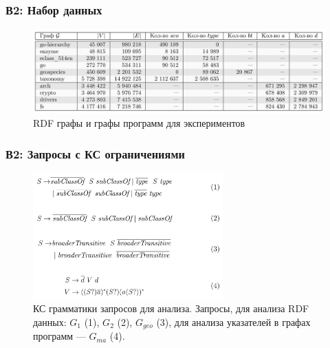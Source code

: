 \documentclass[aspectratio=169,xcolor=table,english]{beamer}
\begin{document}
\begin{frame}[fragile] \frametitle{В2: Набор данных}
    \begin{center}
     \begin{minipage}[m]{0.9\linewidth}
        \begin{figure}
            \centering
            \includegraphics[width=1.0\textwidth]{figures/dataset_rq2.png}
            \caption{RDF графы и графы программ для экспериментов}
        \end{figure}
    \end{minipage}\hfill   
    \end{center}
\end{frame}

\begin{frame}[fragile] \frametitle{В2: Запросы с КС ограничениями}
    \begin{center}
     \begin{minipage}[m]{0.85\linewidth}
        \begin{figure}
            \centering
            \includegraphics[width=0.65\textwidth]{figures/cfpq_query_rq2.png}
            \caption{КС грамматики запросов для анализа. Запросы, для анализа RDF данных: $G_1$ (1), $G_2$ (2), $G_{geo}$ (3), для анализа указателей в графах программ --- $G_{ma}$ (4).}
        \end{figure}
    \end{minipage}\hfill   
    \end{center}
\end{frame}
\end{document}
